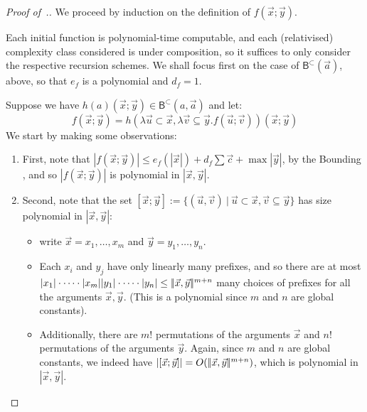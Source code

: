 \documentclass[manuscript,screen]{acmart}
\newcommand{\dfn}{:=}
\theoremstyle{definition}
\theoremstyle{remark}
\newcommand{\permpref}{\subset}
\newcommand{\permprefeq}{\subseteq}
\newcommand{\ptime}{\mathbf{PTIME}}
\newcommand{\f}{\mathbf{F}}
\newcommand{\fptime}{\f\ptime}
\newcommand{\sumlen}[1]{|\hspace{-.15em}|#1|\hspace{-.15em}|}
\newcommand{\bc}{\mathsf{B}}
\newcommand{\bcwfpo}[1]{\bc^{#1}}
\newcommand{\bcpp}{\bcwfpo{\permpref}}
\begin{document}
\begin{proof}[Proof of~.]
We proceed by induction on the definition of $f(\vec x;\vec y)$.

Each initial function is polynomial-time computable, and each (relativised) complexity class considered is under composition, so it suffices to only consider the respective recursion schemes.
We shall focus first on the case of $\bcpp (\vec a)$,  above, so that $e_f$ is a polynomial and $d_f=1$.



Suppose we have $h(a)(\vec x;\vec y) \in \bcpp(a, \vec a)$ and let:
\[
f(\vec x;\vec y) = h(\lambda \vec u \subset \vec x, \lambda \vec v \subseteq \vec y. f(\vec u; \vec v))(\vec x;\vec y)
\]
We start by making some observations:
\begin{enumerate}
    \item\label{item:poly-growth-rate} First, note that $|f(\vec x;\vec y)| \leq e_f(|\vec x|) +d_f\sum \vec c + \max |\vec y| $, by the Bounding , and so $|f(\vec x;\vec y)|$ is polynomial in $|\vec x,\vec y|$.
\item\label{item:poly-many-pp} Second, note that the set $[\vec x;\vec y] \dfn \{(\vec u,\vec v) \ | \ \vec u \permpref \vec x , \vec v \permprefeq \vec y\} $ has size polynomial in $|\vec x,\vec y|$:
\begin{itemize}
    \item write $\vec x = x_1 , \dots, x_m$ and $\vec y = y_1, \dots, y_n$.
    \item Each $x_i$ and $y_j$ have only linearly many prefixes, and so there are at most $|x_1|\cdot \cdots \cdot |x_m||y_1| \cdot \cdots \cdot |y_n| \leq \sumlen{\vec x,\vec y}^{m+n}$ many choices of prefixes for all the arguments $\vec x, \vec y$. 
    (This is a polynomial since $m$ and $n$ are global constants).
    \item Additionally, there are $m!$ permutations of the arguments $\vec x$ and $n!$ permutations of the arguments $\vec y$.
    Again, since $m$ and $n$ are global constants, we indeed have
    $|[\vec x;\vec y]| = O(\sumlen{\vec x, \vec y}^{m+n})$, which is polynomial in $|\vec x,\vec y|$.
\end{itemize}
\end{enumerate}


\end{proof}
\end{document}
